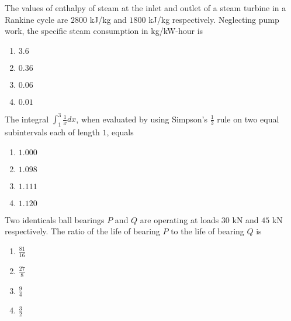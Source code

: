 \item The values of enthalpy of steam at the inlet and outlet of a steam turbine in a Rankine cycle are $2800$ kJ/kg and $1800$ kJ/kg respectively. Neglecting pump work, the specific steam consumption in kg/kW-hour is
\hfill{}
\begin{enumerate}
\item $3.6$
\item $0.36$
\item $0.06$
\item $0.01$
\end{enumerate}

\item The integral $\int_{1}^{3} {\frac{1}{x} dx}$, when evaluated by using Simpson's $\frac{1}{3}$ rule on two equal subintervals each of length $1$, equals
\hfill{}
\begin{enumerate}
\item $1.000$
\item $1.098$
\item $1.111$
\item $1.120$
\end{enumerate}

\item Two identicals ball bearings $P$ and $Q$ are operating at loads $30$ kN and $45$ kN respectively. The ratio of the life of bearing $P$ to the life of bearing $Q$ is
\hfill{}
\begin{enumerate}
\item $\frac{81}{16}$
\item $\frac{27}{8}$
\item $\frac{9}{4}$
\item $\frac{3}{2}$
\end{enumerate}

